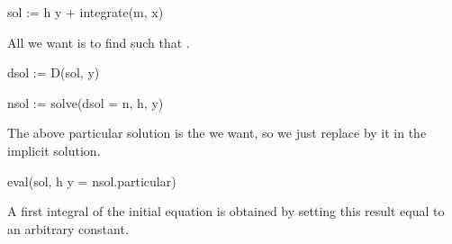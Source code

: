 {{{{{{{{{{{{{{{{\begin{xtc}
\begin{spadsrc}
sol := h y + integrate(m, x) 
\end{spadsrc}
\begin{TeXOutput}
\begin{fricasmath}{14}
%
\end{fricasmath}
\end{TeXOutput}
\end{xtc}
%
%
\begin{xtc}
\begin{xtccomment}
All we want is to find  such that
.
\end{xtccomment}
\begin{spadsrc}
dsol := D(sol, y) 
\end{spadsrc}
\begin{TeXOutput}
\begin{fricasmath}{15}
%
\end{fricasmath}
\end{TeXOutput}
\end{xtc}
\begin{xtc}
\begin{xtccomment}
\end{xtccomment}
\begin{spadsrc}
nsol := solve(dsol = n, h, y) 
\end{spadsrc}
\begin{TeXOutput}
\begin{fricasmath}{16}
%
\end{fricasmath}
\end{TeXOutput}
\end{xtc}
%
\begin{xtc}
\begin{xtccomment}
The above particular solution is the  we want, so we just replace
 by it in the implicit solution.
\end{xtccomment}
\begin{spadsrc}
eval(sol, h y = nsol.particular) 
\end{spadsrc}
\begin{TeXOutput}
\begin{fricasmath}{17}
%
\end{fricasmath}
\end{TeXOutput}
\end{xtc}
%
A first integral of the initial equation is obtained by setting
this result equal to an arbitrary constant.

}}}}}}}}}}}}}}}}
